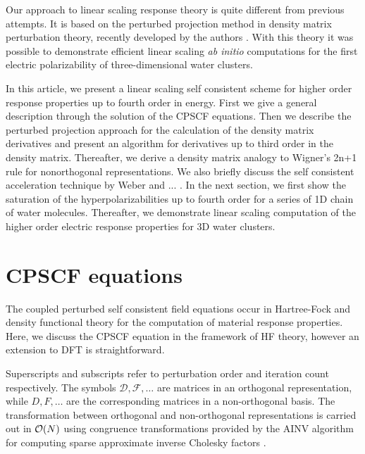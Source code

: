 \documentclass[prl,aps,twocolumn,showpacs,twocolumngrid,superbib]{revtex4}
\begin{document}
 Our approach to linear scaling response theory is quite different 
 from previous attempts. It is based on the perturbed projection
 method in density matrix perturbation theory, recently developed
 by the authors \cite{Niklasson04,Weber04}. With this theory it
 was possible to demonstrate efficient linear scaling {\em ab initio}
 computations for the first electric polarizability of three-dimensional 
 water clusters.

 In this article, we present a linear scaling self consistent scheme
 for higher order response properties up to fourth order in energy.
 First we give a general description through the solution of the CPSCF equations.
 Then we describe the perturbed projection approach for the calculation
 of the density matrix derivatives and present
 an algorithm for derivatives up to third order in the density matrix.
 Thereafter, we derive a density matrix analogy to Wigner's 2n+1
 rule for nonorthogonal representations. We also briefly discuss the
 self consistent acceleration technique by Weber and ... . In the next section,
 we first show the saturation of the hyperpolarizabilities up to fourth order
 for a series of 1D chain of water molecules. Thereafter, we demonstrate
 linear scaling computation of the higher order electric response properties
 for 3D water clusters.


\section{CPSCF equations}
The coupled perturbed self consistent field equations occur in Hartree-Fock
and density functional theory for the computation of material response
properties. Here, we discuss the CPSCF equation in the framework of
HF theory, however an extension to DFT is straightforward.

Superscripts and subscripts refer to perturbation order and 
iteration count respectively. The symbols $\mathcal{D},\mathcal{F},\dots$
are matrices in an orthogonal representation, while
$D,F,\dots$ are the corresponding matrices in a non-orthogonal basis.
The transformation between orthogonal and non-orthogonal 
representations is carried out in ${\cal O}(N)$ using
congruence transformations \cite{JWilkinson65,GStewart73} provided 
by the AINV algorithm for computing sparse approximate inverse 
Cholesky factors \cite{MBenzi95,MBenzi96,MBenzi01}.
\end{document}

